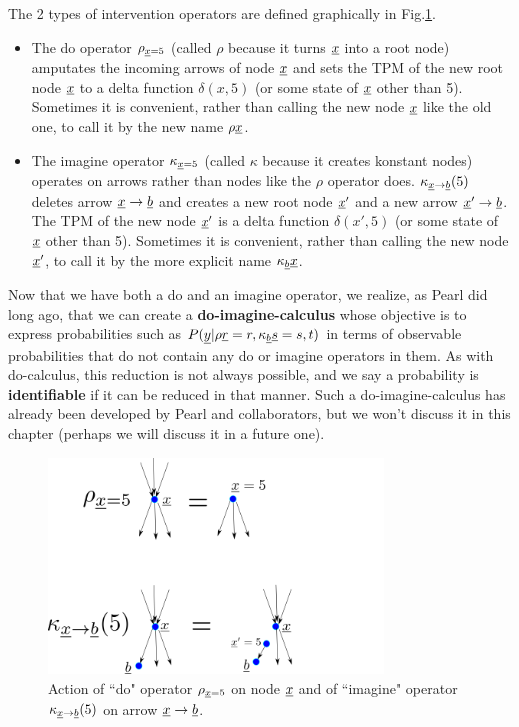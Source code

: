 The 2  types of
intervention operators
are defined 
graphically in Fig.\ref{fig-rho-kappa}.
\begin{itemize}
\item
The do operator $\rho_{{\underline{x}}=5}$
(called $\rho$ because  it turns ${\underline{x}}$
into a root node)
amputates
the incoming arrows of node ${\underline{x}}$
and sets the TPM
of the new root node ${\underline{x}}$
to a delta function $\delta(x, 5)$
(or some state of ${\underline{x}}$ other than 5).
Sometimes it is convenient,
rather than calling the
new node ${\underline{x}}$ like
the old one, to call
it by the new name $\rho{\underline{x}}$.
\item
The imagine operator $\kappa_{{\underline{x}}=5}$
(called $\kappa$ because it
 creates konstant nodes)
operates on arrows
rather than nodes like the 
$\rho$ operator does.
$\kappa_{{\underline{x}}\rightarrow{\underline{b}}}(5)$
deletes
arrow ${\underline{x}}\rightarrow{\underline{b}}$
and
creates a new root node 
${\underline{x}}'$
and a new arrow
${\underline{x}}'\rightarrow {\underline{b}}$. The
TPM of the new node ${\underline{x}}'$ is a 
delta function $\delta(x', 5)$
(or some state of ${\underline{x}}$ other than 5).
Sometimes it is convenient,
rather than calling the
new node ${\underline{x}}'$, to call
it by the 
more
explicit name $\kappa_{\underline{b}}{\underline{x}}$.
\end{itemize}

Now that we have 
both a do and an imagine operator,
we realize,
as Pearl did long ago,
that we can create
a {\bf do-imagine-calculus}
whose
objective
is to 
express
probabilities such as 
$P({\underline{y}}|\rho{\underline{r}}=r, 
\kappa_{\underline{b}} {\underline{s}}=s, t)$
in terms of observable 
probabilities
that do not
contain
any do or imagine
operators in them.
As with
do-calculus,
this reduction
is not 
always possible,
and we say a probability is
{\bf identifiable}
if it  can be reduced
in that manner.
Such a do-imagine-calculus
has already
been developed
by Pearl and collaborators,
but
we won't 
discuss it in this chapter (perhaps
we  will discuss it
in a future one).


\begin{figure}[h!]
\centering
\includegraphics[width=3.5in]
{counterf/rho-kappa.png}
\caption{Action
of ``do" operator $\rho_{{\underline{x}}=5}$
on node ${\underline{x}}$
and of ``imagine" operator 
$\kappa_{{\underline{x}}\rightarrow {\underline{b}}}(5)$
on arrow ${\underline{x}}\rightarrow {\underline{b}}$.} 
\label{fig-rho-kappa}
\end{figure}


